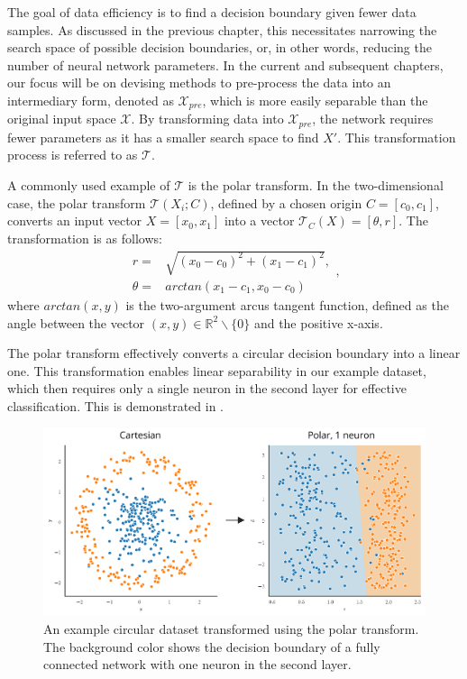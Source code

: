 
The goal of data efficiency is to find a decision boundary given fewer data samples. As discussed in the previous chapter, this necessitates narrowing the search space of possible decision boundaries, or, in other words, reducing the number of neural network parameters. In the current and subsequent chapters, our focus will be on devising methods to pre-process the data into an intermediary form, denoted as \(\mathcal{X}_{pre}\), which is more easily separable than the original input space \(\mathcal{X}\). By transforming data into \(\mathcal{X}_{pre}\), the network requires fewer parameters as it has a smaller search space to find \(X'\). This transformation process is referred to as \(\mathcal{T}\).

A commonly used example of $\mathcal{T}$ is the polar transform. In the two-dimensional case, the polar transform \(\mathcal{T}(X_i; C)\), defined by a chosen origin \(C = [c_0, c_1]\), converts an input vector \(X = [x_0, x_1]\) into a vector \(\mathcal{T}_C(X) = [\theta, r]\). The transformation is as follows:
\begin{equation}
    \begin{aligned}
	r =& \sqrt{(x_0 - c_0)^2 + (x_1 - c_1)^2},\\
	\theta =& arctan(x_1 - c_1, x_0 - c_0)
    \end{aligned},
\end{equation}
where $arctan(x, y)$ is the two-argument arcus tangent function, defined as the angle between the vector $(x, y) \in \mathbb{R}^2 \backslash\{0\}$ and the positive x-axis.

The polar transform effectively converts a circular decision boundary into a linear one. This transformation enables linear separability in our example dataset, which then requires only a single neuron in the second layer for effective classification. This is demonstrated in .

	\begin{figure}[t!]
		\centering
		\includegraphics[width=0.65\linewidth]{images/4/polar_dataset_neurons}
		\caption{An example circular dataset transformed using the polar transform. The background color shows the decision boundary of a fully connected network with one neuron in the second layer.}
		\label{fig:polar_dataset_neurons}
	\end{figure}
	
